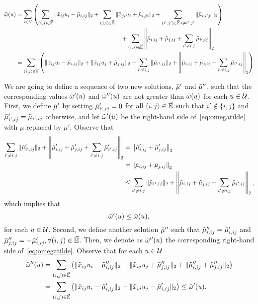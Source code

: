 \documentclass[12pt]{article}
\begin{document}
\begin{appendix}
\begin{align}
\tilde{\omega}(u)&= \sum_{i\in \mathbb{V}}\left(
\sum_{(i,j)\in \Vec{\mathbb{E}}} \|\tilde{x}_{ij}u_i-\tilde{\mu}_{i,ij}\|_2+\sum_{(j,i)\in \Vec{\mathbb{E}}} \|\tilde{x}_{ji}u_i+\tilde{\mu}_{i,ji}\|_2 + \sum_{(i',j')\in \Vec{\mathbb{E}}:i\neq i',j'} \|\tilde{\mu}_{i,i'j'}\|_2
\right)\nonumber\\
&\qquad\qquad\qquad\qquad\qquad\qquad\qquad\qquad\qquad+
\sum_{(i,j)\in \Vec{\mathbb{E}}} \left\|\tilde{\mu}_{i,ij}+\tilde{\mu}_{j,ij}+\sum_{i'\neq i,j}\tilde{\mu}_{i',ij}\right\|_2\\
&=\sum_{(i,j)\in \Vec{\mathbb{E}}}\left(
\|\tilde{x}_{ij}u_i-\tilde{\mu}_{i,ij}\|_2
+\|\tilde{x}_{ij}u_j+\tilde{\mu}_{j,ij}\|_2
+ \sum_{i'\neq i,j}\|\tilde{\mu}_{i',ij}\|_2
+ \left\|\tilde{\mu}_{i,ij}+\tilde{\mu}_{j,ij}+\sum_{i'\neq i,j}\tilde{\mu}_{i',ij}\right\|_2
\right)\label{eq:omegatilde}
\end{align}

We are going to define a sequence of two new solutions, $\tilde{\mu}'$ and $\tilde{\mu}''$, such that the corresponding values $\tilde{\omega}'(u)$ and $\tilde{\omega}''(u)$ are not greater than $\tilde{\omega}(u)$ for each $u\in\mathcal{U}$. First, we define $\tilde{\mu}'$ by setting $\tilde{\mu}'_{i',ij}=0$ for all $(i,j)\in \Vec{\mathbb{E}}$ such that $i'\notin\{i,j\}$ and $\tilde{\mu}_{i',ij}'=\tilde{\mu}_{i',ij}$ otherwise, and let $\tilde{\omega}^{\prime}(u)$ be the right-hand side of~\eqref{eq:omegatilde} with $\mu$ replaced by $\mu'$.
Observe that
\begin{align*}
\sum_{i'\neq i,j}\|\tilde{\mu}_{i',ij}'\|_2
+ \left\|\tilde{\mu}_{i,ij}'+\tilde{\mu}_{j,ij}'+\sum_{i'\neq i,j}\tilde{\mu}_{i',ij}'\right\|_2
&=
\left\|\tilde{\mu}_{i,ij}'+\tilde{\mu}_{j,ij}'\right\|_2 \\
&= \left\|\tilde{\mu}_{i,ij}+\tilde{\mu}_{j,ij}\right\|_2 \\
&\leq \sum_{i'\neq i,j}\|\tilde{\mu}_{i',ij}\|_2
+ \left\|\tilde{\mu}_{i,ij}+\tilde{\mu}_{j,ij}+\sum_{i'\neq i,j}\tilde{\mu}_{i',ij}\right\|_2,
\end{align*}
which implies that 
\begin{equation}
\label{eq:primebetter}
\tilde{\omega}^{\prime}(u)\leq\tilde{\omega}(u), 
\end{equation}
for each $u\in\mathcal{U}$. Second, we define another solution $\tilde{\mu}''$ such that $\tilde{\mu}''_{i,ij}=\tilde{\mu}'_{i,ij}$ and $\tilde{\mu}''_{j,ij}=-\tilde{\mu}'_{i,ij}, \forall(i,j) \in\Vec{\mathbb{E}}$. 
Then, we denote as $\tilde{\omega}^{\prime\prime}(u)$ the corresponding right-hand side of~\eqref{eq:omegatilde}. 
Observe that for each $u\in\mathcal{U}$
\begin{align}
\tilde{\omega}^{\prime\prime}(u)
&=\sum_{(i,j)\in \Vec{\mathbb{E}}}\left(
\|\tilde{x}_{ij}u_i-\tilde{\mu}_{i,ij}''\|_2
+\|\tilde{x}_{ij}u_j+\tilde{\mu}''_{j,ij}\|_2
+ \|\tilde{\mu}_{i,ij}''+\tilde{\mu}''_{j,ij}\|_2
\right)\\
&= \sum_{(i,j)\in \Vec{\mathbb{E}}}\left(
\|\tilde{x}_{ij}u_i-\tilde{\mu}'_{i,ij}\|_2
+\|\tilde{x}_{ij}u_j-\tilde{\mu}'_{i,ij}\|_2
\right)
\leq
\tilde{\omega}^{\prime}(u).
\label{eq:primeprimebetter}
\end{align}


\end{appendix}
\end{document}
